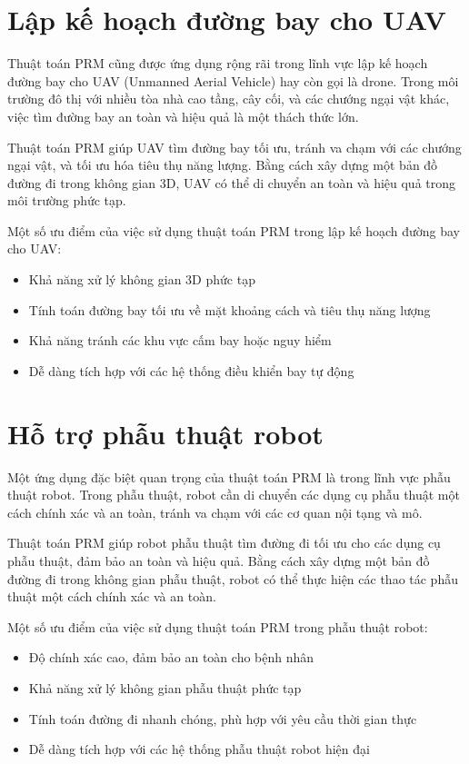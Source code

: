 \documentclass[12pt,a4paper,openany,oneside]{report}
\begin{document}
\section{Lập kế hoạch đường bay cho UAV}

Thuật toán PRM cũng được ứng dụng rộng rãi trong lĩnh vực lập kế hoạch đường bay cho UAV (Unmanned Aerial Vehicle) hay còn gọi là drone. Trong môi trường đô thị với nhiều tòa nhà cao tầng, cây cối, và các chướng ngại vật khác, việc tìm đường bay an toàn và hiệu quả là một thách thức lớn.

Thuật toán PRM giúp UAV tìm đường bay tối ưu, tránh va chạm với các chướng ngại vật, và tối ưu hóa tiêu thụ năng lượng. Bằng cách xây dựng một bản đồ đường đi trong không gian 3D, UAV có thể di chuyển an toàn và hiệu quả trong môi trường phức tạp.

Một số ưu điểm của việc sử dụng thuật toán PRM trong lập kế hoạch đường bay cho UAV:
\begin{itemize}
    \item Khả năng xử lý không gian 3D phức tạp
    \item Tính toán đường bay tối ưu về mặt khoảng cách và tiêu thụ năng lượng
    \item Khả năng tránh các khu vực cấm bay hoặc nguy hiểm
    \item Dễ dàng tích hợp với các hệ thống điều khiển bay tự động
\end{itemize}

\section{Hỗ trợ phẫu thuật robot}

Một ứng dụng đặc biệt quan trọng của thuật toán PRM là trong lĩnh vực phẫu thuật robot. Trong phẫu thuật, robot cần di chuyển các dụng cụ phẫu thuật một cách chính xác và an toàn, tránh va chạm với các cơ quan nội tạng và mô.

Thuật toán PRM giúp robot phẫu thuật tìm đường đi tối ưu cho các dụng cụ phẫu thuật, đảm bảo an toàn và hiệu quả. Bằng cách xây dựng một bản đồ đường đi trong không gian phẫu thuật, robot có thể thực hiện các thao tác phẫu thuật một cách chính xác và an toàn.

Một số ưu điểm của việc sử dụng thuật toán PRM trong phẫu thuật robot:
\begin{itemize}
    \item Độ chính xác cao, đảm bảo an toàn cho bệnh nhân
    \item Khả năng xử lý không gian phẫu thuật phức tạp
    \item Tính toán đường đi nhanh chóng, phù hợp với yêu cầu thời gian thực
    \item Dễ dàng tích hợp với các hệ thống phẫu thuật robot hiện đại
\end{itemize}
\end{document}
